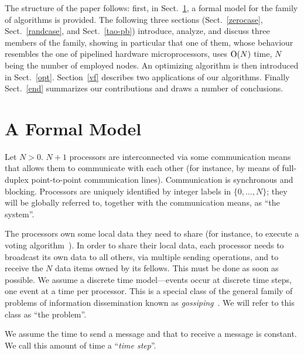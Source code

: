 \documentclass{elsart}
\begin{document}
The structure of the paper follows:
first, in Sect.~\ref{model}, a formal model for the family of algorithms is provided.
The following three sections (Sect.~\ref{zerocase}, Sect.~\ref{randcase}, and Sect.~\ref{tao-pb})
introduce, analyze, and discuss 
three members of the family, showing in particular that one of them,
whose behaviour resembles the one of pipelined hardware microprocessors,
uses $\hbox{O}(N)$ time, $N$ being the number of employed nodes.
An optimizing algorithm is then introduced in Sect.~\ref{opt}.
Section~\ref{vf} describes two applications of our algorithms.
Finally Sect.~\ref{end} summarizes our contributions 
and draws a number of conclusions.


\section{A Formal Model}\label{model}
\begin{defn}[system]
Let $N>0$. $N+1$ processors are interconnected via some communication
means that allows them to communicate with each other (for instance, by means
of full-duplex point-to-point communication lines).
Communication is synchronous and blocking.
Processors are uniquely identified by integer labels in $\{0,\dots,N\}$;
they will be globally referred to, together with the communication
means, as ``the system''.
\end{defn}

\begin{defn}[problem]\label{problem}
The processors own some local data
they need to share (for instance, to execute a voting algorithm~\emph{\cite{John89a}}).
In order to share their local data, each processor needs to
broadcast its own data to all others, via multiple sending operations,
and to receive the $N$ data items
owned by its fellows. This must be done as soon as possible.
We assume a discrete time model---events occur at discrete time
steps, one event at a time per processor. 
This is a special class of the general family
of problems of information dissemination
known as \emph{gossiping\/}~\emph{\cite{Goss,BGRV98,Gon03}}. We will refer to this class
as ``the problem''.
\end{defn}

\begin{defn}
\label{timestep}
We assume the time to send a message and that to receive a message
is constant. We call this amount of time a ``\emph{time step}''.
\end{defn}
\end{document}
